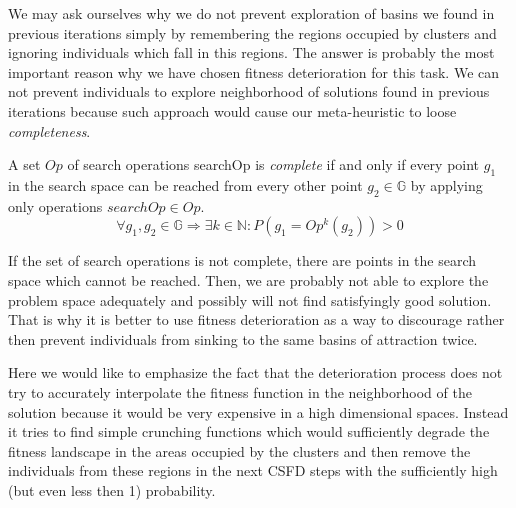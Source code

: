 We may ask ourselves why we do not prevent exploration of basins 
we found in previous iterations simply by remembering the regions occupied
by clusters and ignoring individuals which fall in this regions.
The answer is probably the most important reason why we have chosen fitness
deterioration for this task. 
We can not prevent individuals to explore
neighborhood of solutions found in previous iterations because such
approach would cause our meta-heuristic to loose \textit{completeness}. 

\begin{definition}\label{completeness}
A set $Op$ of search operations searchOp is \textit{complete}
if and only if every point $g_1$ in the search space 
can be reached from every other point $g_2 \in \mathbb{G}$ by applying
only operations $searchOp \in Op$.
\begin{equation}
\forall g_1, g_2 \in \mathbb{G} \Rightarrow \exists k \in \mathbb{N}:
P(g_1=Op^k(g_2)) > 0
\end{equation} 
\end{definition}

If the set of search operations is not complete, there are points 
in the search space which cannot be reached. 
Then, we are probably not able to explore the problem space adequately 
and possibly will not find satisfyingly good solution. 
That is why it is better to use fitness deterioration as a way to discourage
rather then prevent individuals from sinking to the same basins of attraction twice.

Here we would like to emphasize the fact that the
deterioration process does not try to accurately interpolate the fitness
function in the neighborhood of the solution because it would be very
expensive in a high dimensional spaces. Instead it tries to find simple
crunching functions which would sufficiently degrade the fitness landscape in the areas 
occupied by the clusters and then remove the individuals from these regions
in the next CSFD steps with the sufficiently high (but even less then 1) probability.


